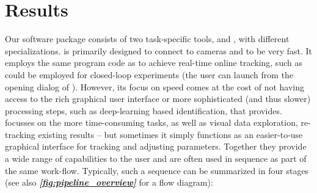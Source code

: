 \documentclass[9pt,lineno]{elife}
\newcommand{\figref}[1]{\textit{\textbf{\ref{#1}}}}
\newcommand{\TRex}{\protect\path{TRex}}
\newcommand{\TGrabs}{\protect\path{TGrabs}}
\newcommand{\changemade}[1]{#1}
\begin{document}
\section{Results}\label{sec:methods_evaluation}


\changemade{Our software package consists of two task-specific tools, \TGrabs{} and \TRex{}, with different specializations. \TGrabs{} is primarily designed to connect to cameras and to be very fast. It employs the same program code as \TRex{} to achieve real-time online tracking, such as could be employed for closed-loop experiments (the user can launch \TGrabs{} from the opening dialog of \TRex{}). However, its focus on speed comes at the cost of not having access to the rich graphical user interface or more sophisticated (and thus slower) processing steps, such as deep-learning based identification, that \TRex{} provides. \TRex{} focusses on the more time-consuming tasks, as well as visual data exploration, re-tracking existing results -- but sometimes it simply functions as an easier-to-use graphical interface for tracking and adjusting parameters. Together they provide a wide range of capabilities to the user and are often used in sequence as part of the same work-flow. Typically, such a sequence can be summarized in four stages (see also \figref{fig:pipeline_overview} for a flow diagram):}

\end{document}
